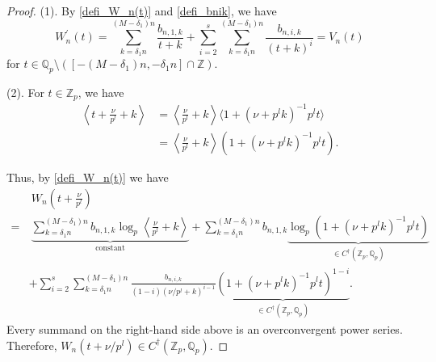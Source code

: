 \documentclass[12pt]{article}
\numberwithin{equation}{section}
\begin{document}
\begin{proof}
(1). By \eqref{defi_W_n(t)} and \eqref{defi_bnik}, we have
\begin{equation*}
W_n^{\prime}(t) = \sum_{k=\delta_1 n}^{(M-\delta_1)n} \frac{b_{n,1,k}}{t+k}  + \sum_{i=2}^{s} \sum_{k=\delta_1 n}^{(M-\delta_1)n} \frac{b_{n,i,k}}{(t+k)^{i}} = V_n(t)
\end{equation*}
for $t \in \mathbb{Q}_p \setminus \left( [-(M-\delta_1)n, -\delta_1n] \cap \mathbb{Z} \right)$.

(2). For $t \in \mathbb{Z}_p$, we have
\begin{align*}
\left\langle t+\frac{\nu}{p^{l}} + k  \right\rangle &= \left\langle \frac{\nu}{p^l} + k \right\rangle \langle 1+(\nu+p^{l}k)^{-1} p^{l}t \rangle \\
&= \left\langle \frac{\nu}{p^l} + k \right\rangle ( 1+(\nu+p^{l}k)^{-1} p^{l}t ). 
\end{align*}

Thus, by \eqref{defi_W_n(t)} we have
\begin{align*}
&~ W_n\left(t+\frac{\nu}{p^l}\right) \\
=&~ \underbrace{\sum_{k=\delta_1 n}^{(M-\delta_1)n} b_{n,1,k}\log_p\left\langle \frac{\nu}{p^l} + k \right\rangle}_{\text{constant}}  + \sum_{k=\delta_1 n}^{(M-\delta_1)n} b_{n,1,k}\underbrace{\log_p( 1+(\nu+p^{l}k)^{-1} p^{l}t)}_{\in C^\dagger(\mathbb{Z}_p,\mathbb{Q}_p)}  \\
&+ \sum_{i=2}^{s} \sum_{k=\delta_1 n}^{(M-\delta_1)n}  \frac{b_{n,i,k}}{(1-i)(\nu/p^l + k)^{i-1}} \underbrace{( 1+(\nu+p^{l}k)^{-1} p^{l}t)^{1-i}}_{\in C^\dagger(\mathbb{Z}_p,\mathbb{Q}_p)}.
\end{align*}
Every summand on the right-hand side above is an overconvergent power series. Therefore, $W_n(t+\nu/p^l) \in C^\dagger(\mathbb{Z}_p,\mathbb{Q}_p)$.


\end{proof}
\end{document}
